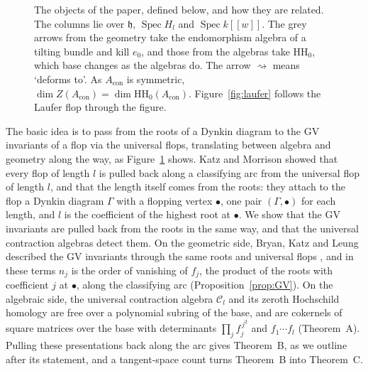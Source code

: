 \documentclass[11pt]{amsart}
\makeatletter
\numberwithin{table}{section}
\numberwithin{figure}{section}
\numberwithin{equation}{section}
\theoremstyle{definition}
\theoremstyle{plain}
\newcommand{\Acon}{A_{\mathrm{con}}}
\newcommand{\cC}{\mathcal{C}}
\newcommand{\h}{\mathfrak{h}}
\newcommand{\bul}{\bullet}
\newcommand{\HH}{\mathrm{HH}}
\DeclareMathOperator{\Spec}{Spec}
\renewcommand\paragraph{\@startsection{paragraph}{4}{\z@}{\medskipamount}{-.5em}{\normalfont\bfseries}}
\makeatother
\begin{document}
\begin{figure}[t]
\caption{The objects of the paper, defined below, and how they are related. The columns lie over $\h$, $\Spec H_l$ and $\Spec k[[w]]$. The grey arrows from the geometry take the endomorphism algebra of a tilting bundle and kill $e_0$, and those from the algebras take $\HH_0$, which base changes as the algebras do. The arrow $\rightsquigarrow$ means `deforms to'. As $\Acon$ is symmetric, $\dim Z(\Acon) = \dim \HH_0(\Acon)$. Figure~\ref{fig:laufer} follows the Laufer flop through the figure.}\label{fig:story}
\end{figure}

\paragraph{The approach.} The basic idea is to pass from the roots of a Dynkin diagram to the GV invariants of a flop via the universal flops, translating between algebra and geometry along the way, as Figure~\ref{fig:story} shows. Katz and Morrison \cite{KM} showed that every flop of length $l$ is pulled back along a classifying arc from the universal flop of length $l$, and that the length itself comes from the roots: they attach to the flop a Dynkin diagram $\Gamma$ with a flopping vertex $\bul$, one pair $(\Gamma, \bul)$ for each length, and $l$ is the coefficient of the highest root at $\bul$. We show that the GV invariants are pulled back from the roots in the same way, and that the universal contraction algebras detect them. On the geometric side, Bryan, Katz and Leung described the GV invariants through the same roots and universal flops \cite{BKL}, and in these terms $n_j$ is the order of vanishing of $f_j$, the product of the roots with coefficient $j$ at $\bul$, along the classifying arc (Proposition~\ref{prop:GV}). On the algebraic side, the universal contraction algebra $\cC_l$ and its zeroth Hochschild homology are free over a polynomial subring of the base, and are cokernels of square matrices over the base with determinants $\prod_j f_j^{\,j^2}$ and $f_1 \cdots f_l$ (Theorem~A). Pulling these presentations back along the arc gives Theorem~B, as we outline after its statement, and a tangent-space count turns Theorem~B into Theorem~C.
\end{document}
